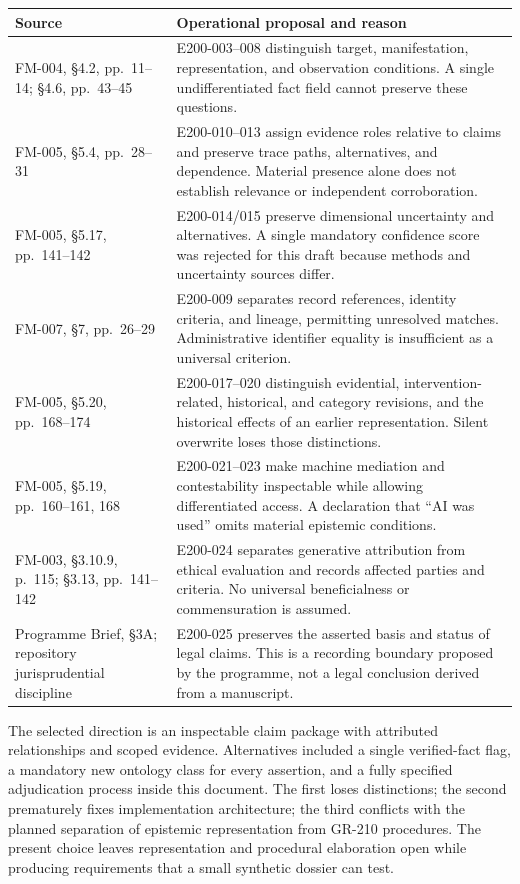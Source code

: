 \documentclass[11pt,a4paper]{article}
\begin{document}
\begin{longtable}{@{}L{0.29\textwidth}L{0.65\textwidth}@{}}
\toprule
Source & Operational proposal and reason \\
\midrule\endhead
FM-004, \S4.2, pp.~11--14; \S4.6, pp.~43--45 & E200-003--008 distinguish target, manifestation, representation, and observation conditions. A single undifferentiated fact field cannot preserve these questions. \\
FM-005, \S5.4, pp.~28--31 & E200-010--013 assign evidence roles relative to claims and preserve trace paths, alternatives, and dependence. Material presence alone does not establish relevance or independent corroboration. \\
FM-005, \S5.17, pp.~141--142 & E200-014/015 preserve dimensional uncertainty and alternatives. A single mandatory confidence score was rejected for this draft because methods and uncertainty sources differ. \\
FM-007, \S7, pp.~26--29 & E200-009 separates record references, identity criteria, and lineage, permitting unresolved matches. Administrative identifier equality is insufficient as a universal criterion. \\
FM-005, \S5.20, pp.~168--174 & E200-017--020 distinguish evidential, intervention-related, historical, and category revisions, and the historical effects of an earlier representation. Silent overwrite loses those distinctions. \\
FM-005, \S5.19, pp.~160--161, 168 & E200-021--023 make machine mediation and contestability inspectable while allowing differentiated access. A declaration that ``AI was used'' omits material epistemic conditions. \\
FM-003, \S3.10.9, p.~115; \S3.13, pp.~141--142 & E200-024 separates generative attribution from ethical evaluation and records affected parties and criteria. No universal beneficialness or commensuration is assumed. \\
Programme Brief, \S3A; repository jurisprudential discipline & E200-025 preserves the asserted basis and status of legal claims. This is a recording boundary proposed by the programme, not a legal conclusion derived from a manuscript. \\
\bottomrule
\end{longtable}

The selected direction is an inspectable claim package with attributed relationships and scoped evidence. Alternatives included a single verified-fact flag, a mandatory new ontology class for every assertion, and a fully specified adjudication process inside this document. The first loses distinctions; the second prematurely fixes implementation architecture; the third conflicts with the planned separation of epistemic representation from GR-210 procedures. The present choice leaves representation and procedural elaboration open while producing requirements that a small synthetic dossier can test.
\end{document}
